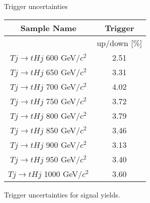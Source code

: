 \begin{frame}{Trigger uncertainties}
\vspace{-.2cm}
\begin{center}
\begin{tabular}{|c|c|}
\hline 
Sample Name & Trigger \\
\hline
 & up/down [\%] \\
\hline
$Tj\rightarrow tHj$ 600 GeV/$c^{2}$ & 2.51 \\
$Tj\rightarrow tHj$ 650 GeV/$c^{2}$ & 3.31 \\
$Tj\rightarrow tHj$ 700 GeV/$c^{2}$ & 4.02 \\
$Tj\rightarrow tHj$ 750 GeV/$c^{2}$ & 3.72 \\
$Tj\rightarrow tHj$ 800 GeV/$c^{2}$ & 3.79 \\
$Tj\rightarrow tHj$ 850 GeV/$c^{2}$ & 3.46 \\
$Tj\rightarrow tHj$ 900 GeV/$c^{2}$ & 3.13 \\
$Tj\rightarrow tHj$ 950 GeV/$c^{2}$ & 3.40 \\
$Tj\rightarrow tHj$ 1000 GeV/$c^{2}$ & 3.60 \\
\hline
\end{tabular}
\end{center}

\vspace{-.2cm}
    \begin{block}{}
      \tiny \centering Trigger uncertainties for signal yields.
    \end{block}

\end{frame}

